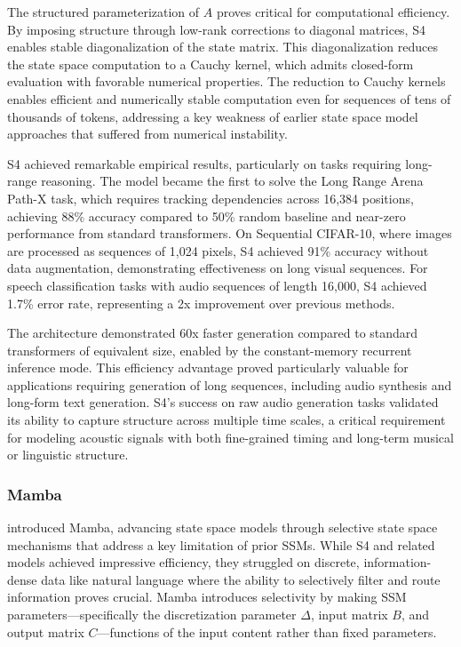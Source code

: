 The structured parameterization of $A$ proves critical for computational efficiency. By imposing structure through low-rank corrections to diagonal matrices, S4 enables stable diagonalization of the state matrix. This diagonalization reduces the state space computation to a Cauchy kernel, which admits closed-form evaluation with favorable numerical properties. The reduction to Cauchy kernels enables efficient and numerically stable computation even for sequences of tens of thousands of tokens, addressing a key weakness of earlier state space model approaches that suffered from numerical instability.

S4 achieved remarkable empirical results, particularly on tasks requiring long-range reasoning. The model became the first to solve the Long Range Arena Path-X task, which requires tracking dependencies across 16,384 positions, achieving 88\% accuracy compared to 50\% random baseline and near-zero performance from standard transformers. On Sequential CIFAR-10, where images are processed as sequences of 1,024 pixels, S4 achieved 91\% accuracy without data augmentation, demonstrating effectiveness on long visual sequences. For speech classification tasks with audio sequences of length 16,000, S4 achieved 1.7\% error rate, representing a 2x improvement over previous methods.

The architecture demonstrated 60x faster generation compared to standard transformers of equivalent size, enabled by the constant-memory recurrent inference mode. This efficiency advantage proved particularly valuable for applications requiring generation of long sequences, including audio synthesis and long-form text generation. S4's success on raw audio generation tasks validated its ability to capture structure across multiple time scales, a critical requirement for modeling acoustic signals with both fine-grained timing and long-term musical or linguistic structure.

\subsubsection{Mamba}

\citet{gu2023mamba} introduced Mamba, advancing state space models through selective state space mechanisms that address a key limitation of prior SSMs. While S4 and related models achieved impressive efficiency, they struggled on discrete, information-dense data like natural language where the ability to selectively filter and route information proves crucial. Mamba introduces selectivity by making SSM parameters—specifically the discretization parameter $\Delta$, input matrix $B$, and output matrix $C$—functions of the input content rather than fixed parameters.

